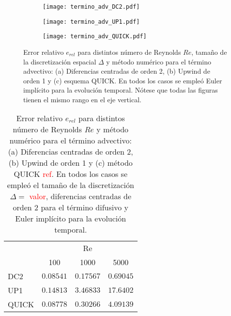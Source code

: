 \documentclass[aps,prb,twocolumn,superscriptaddress,floatfix,longbibliography,10pt]{revtex4-2}
\newcounter{para}
\begin{document}
\begin{figure}
  \centering
  \begin{subfigure}[b]{0.32\textwidth}
      \centering
      \texttt{[image: termino\_adv\_DC2.pdf]}
      \caption{}
      \label{fig:termino_adv_DC2}
  \end{subfigure}
  \hfill
  \begin{subfigure}[b]{0.32\textwidth}
      \centering
      \texttt{[image: termino\_adv\_UP1.pdf]}
      \caption{}
      \label{fig:termino_adv_UP1}
  \end{subfigure}
  \hfill
  \begin{subfigure}[b]{0.32\textwidth}
      \centering
      \texttt{[image: termino\_adv\_QUICK.pdf]}
      \caption{}
      \label{fig:termino_adv_QUICK}
  \end{subfigure}
     \caption{Error relativo $e_{rel}$ para distintos número de Reynolds $Re$, tamaño de la discretización espacial $\Delta$ y método numérico para el término advectivo: (a) Diferencias centradas de orden 2, (b) Upwind de orden 1 y (c) esquema QUICK. En todos los casos se empleó Euler implícito para la evolución temporal. Nótese que todas las figuras tienen el mismo rango en el eje vertical.}
     \label{fig:termino_advectivo}
\end{figure}






\begin{table}[]
  \begin{tabular}{l|lll|}
  \cline{2-4}
            & \multicolumn{3}{c|}{Re}                                     \\ \cline{2-4} 

            & \multicolumn{1}{c|}{100} & \multicolumn{1}{c|}{1000} &  \multicolumn{1}{c|}{5000} \\ \hline
  \multicolumn{1}{|l|}{DC2} & \multicolumn{1}{c|}{$0.08541$} & \multicolumn{1}{c|}{$0.17567$} & $0.69045$ \\ \hline
  \multicolumn{1}{|l|}{UP1} & \multicolumn{1}{c|}{$0.14813$} & \multicolumn{1}{c|}{$3.46833$} & $17.6402$ \\ \hline
  \multicolumn{1}{|l|}{QUICK} & \multicolumn{1}{c|}{$0.08778$} & \multicolumn{1}{c|}{$0.30266$} & $4.09139$ \\ \hline
  \end{tabular}
  \label{tabla:erel}
  \caption{Error relativo $e_{rel}$ para distintos número de Reynolds $Re$ y método numérico para el término advectivo: (a) Diferencias centradas de orden 2, (b) Upwind de orden 1 y (c) método QUICK \textcolor{red}{ref}. En todos los casos se empleó el tamaño de la discretización $\Delta = $ \textcolor{red}{valor}, diferencias centradas de orden 2 para el término difusivo y Euler implícito para la evolución temporal.}
\end{table}
\end{document}
